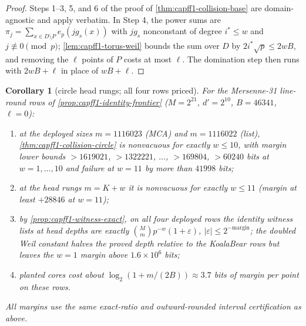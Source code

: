\documentclass[11pt]{article}
\newtheorem{corollary}[corollary]{Corollary}
\theoremstyle{definition}
\theoremstyle{remark}
\begin{document}
\begin{proof}
Steps 1--3, 5, and 6 of the proof of \cref{thm:capff1-collision-base} are domain-agnostic and apply verbatim.  In Step 4, the power sums are $\pi_j=\sum_{x\in D\setminus P}e_p(jg_s(x))$ with $jg_s$ nonconstant of degree $i^*\le w$ and $j\not\equiv0\pmod p$; \cref{lem:capff1-torus-weil} bounds the sum over $D$ by $2i^*\sqrt p\le2wB$, and removing the $\ell$ points of $P$ costs at most $\ell$.  The domination step then runs with $2wB+\ell$ in place of $wB+\ell$.
\end{proof}

\begin{corollary}[circle head rungs; all four rows priced]\label{cor:capff1-circle-head}
For the Mersenne-31 line-round rows of \cref{prop:capff1-identity-frontier} \textup{($M=2^{21}$, $d'=2^{10}$, $B=46341$, $\ell=0$)}:
\begin{enumerate}[label=\textup{(\alph*)}]
\item at the deployed sizes $m=1116023$ \textup{(MCA)} and $m=1116022$ \textup{(list)}, \cref{thm:capff1-collision-circle} is nonvacuous for exactly $w\le10$, with margin lower bounds $>1619021$, $>1322221$, $\ldots$, $>169804$, $>60240$ bits at $w=1,\ldots,10$ and failure at $w=11$ by more than $41998$ bits;
\item at the head rungs $m=K+w$ it is nonvacuous for exactly $w\le11$ \textup{(margin at least $+28846$ at $w=11$)};
\item by \cref{prop:capff1-witness-exact}, on all four deployed rows the identity witness lists at head depths are exactly $\binom Mm p^{-w}(1+\varepsilon)$, $|\varepsilon|\le2^{-\mathrm{margin}}$; the doubled Weil constant halves the proved depth relative to the KoalaBear rows but leaves the $w=1$ margin above $1.6\times10^6$ bits;
\item planted cores cost about $\log_2(1+m/(2B))\approx3.7$ bits of margin per point on these rows.
\end{enumerate}
All margins use the same exact-ratio and outward-rounded interval certification as above.
\end{corollary}
\end{document}
